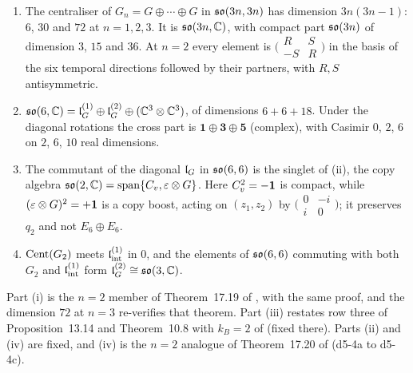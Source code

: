\begin{proposition}[$\Cent(G_2)=\so{6,\C}$ and the copy algebra]
\label{d5:prop:so6C}
\begin{enumerate}[label=(\roman*),leftmargin=2.2em]
\item The centraliser of $G_n=G\oplus\cdots\oplus G$ in $\mathfrak{so}(3n,3n)$ has dimension $3n(3n-1)$: $6$, $30$ and $72$ at $n=1,2,3$. It is $\mathfrak{so}(3n,\mathbb{C})$, with
compact part $\mathfrak{so}(3n)$ of dimension $3$, $15$ and $36$. At $n=2$ every element is $\bigl(\begin{smallmatrix}R&S\\-S&R\end{smallmatrix}\bigr)$ in the
basis of the six temporal directions followed by their partners, with $R,S$ antisymmetric.
\item $\mathfrak{so}(6,\mathbb{C})=\mathfrak l_G^{(1)}\oplus\mathfrak l_G^{(2)}\oplus(\mathbb{C}^3\otimes\mathbb{C}^3)$, of dimensions $6+6+18$. Under the diagonal rotations the cross part is
$\mathbf1\oplus\mathbf3\oplus\mathbf5$ (complex), with Casimir $0$, $2$, $6$ on $2$, $6$, $10$ real dimensions.
\item The commutant of the diagonal $\mathfrak l_G$ in $\mathfrak{so}(6,6)$ is the singlet of (ii), the copy algebra $\mathfrak{so}(2,\mathbb{C})=\operatorname{span}\{C_v,\varepsilon\otimes G\}$. Here
$C_v^2=-\mathbf 1$ is compact, while $(\varepsilon\otimes G)^2=+\mathbf 1$ is a copy boost, acting on $(z_1,z_2)$ by $\bigl(\begin{smallmatrix}0&-i\\ i&0\end{smallmatrix}\bigr)$; it
preserves $q_2$ and not $E_6\oplus E_6$.
\item $\operatorname{Cent}(G_2)$ meets $\mathfrak l_{\rm int}^{(1)}$ in $0$, and the elements of $\mathfrak{so}(6,6)$ commuting with both $G_2$ and $\mathfrak l_{\rm int}^{(1)}$ form $\mathfrak l_G^{(2)}\cong\mathfrak{so}(3,\mathbb{C})$.
\end{enumerate}
\end{proposition}

Part (i) is the $n=2$ member of Theorem~17.19 of \cite{ES17}, with the same proof, and the dimension $72$ at $n=3$ re-verifies that theorem.
Part (iii) restates row three of Proposition~13.14 and Theorem~10.8 with $k_B=2$ of \cite{ES17} (fixed there). Parts (ii) and (iv) are fixed,
and (iv) is the $n=2$ analogue of Theorem~17.20 of \cite{ES17} (d5-4a to d5-4c).

